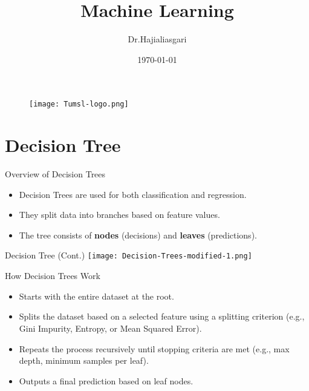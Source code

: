 \documentclass[serif, aspectratio=169]{beamer}
\author{Dr.Hajialiasgari}
\title{Machine Learning}
\institute{
    Tehran University \\
    Of\\
    Medical Science
}
\date{\small \today}
\begin{document}
\begin{frame}
    \titlepage
    \vspace*{-0.6cm}
    \begin{figure}[htpb]
        \begin{center}
            \texttt{[image: Tumsl-logo.png]}
        \end{center}
    \end{figure}
\end{frame}

\begin{frame}    
\tableofcontents[sectionstyle=show, subsectionstyle=show/shaded/hide, subsubsectionstyle=show/shaded/hide]
\end{frame}

\section{Decision Tree}
\begin{frame}{Overview of Decision Trees}
    \begin{itemize}
        \item Decision Trees are used for both classification and regression.
        \item They split data into branches based on feature values.
        \item The tree consists of \textbf{nodes} (decisions) and \textbf{leaves} (predictions).
    \end{itemize}
\end{frame}

\begin{frame}{Decision Tree (Cont.)}
    \centering
    \texttt{[image: Decision-Trees-modified-1.png]}
\end{frame}

\begin{frame}{How Decision Trees Work}
    \begin{itemize}
        \item Starts with the entire dataset at the root.
        \item Splits the dataset based on a selected feature using a splitting criterion (e.g., Gini Impurity, Entropy, or Mean Squared Error).
        \item Repeats the process recursively until stopping criteria are met (e.g., max depth, minimum samples per leaf).
        \item Outputs a final prediction based on leaf nodes.
    \end{itemize}
\end{frame}
\end{document}
